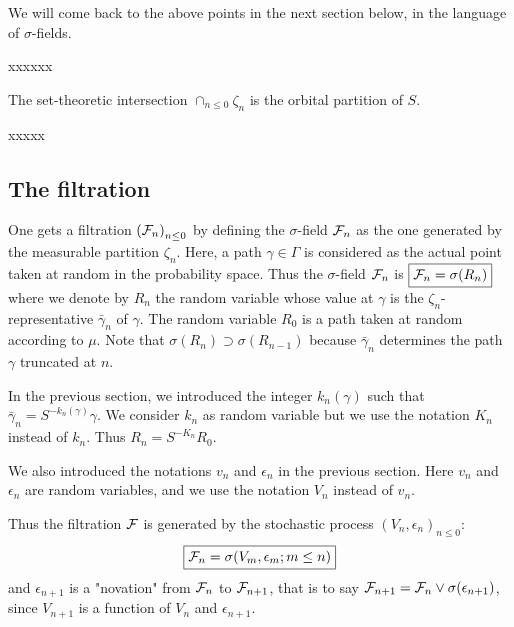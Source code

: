 \documentclass[12pt,a4paper]{article}
\begin{document}
We will come back to the above points in the next section below, in the 
language of $\sigma$-fields. 

\bigskip 

xxxxxx

\begin{lemma}
The set-theoretic intersection $\cap_{n \leq 0} \zeta_n$ is the orbital partition of $S$. 
\end{lemma}


%

xxxxx

\subsection{The filtration}

One gets a filtration ${(\mathcal{F}_n)}_{n \leq 0}$ by defining the $\sigma$-field 
$\mathcal{F}_n$ as the one generated by the measurable partition $\zeta_n$. 
Here, a path $\gamma \in \Gamma$ is considered as the actual point taken at random 
in the probability space. 
Thus the $\sigma$-field $\mathcal{F}_n$ is 
$\boxed{\mathcal{F}_n = \sigma(R_n)}$ where we denote by $R_n$ the random variable whose 
value at $\gamma$ is the $\zeta_n$-representative 
$\bar\gamma_n$ of $\gamma$. 
The random variable  $R_0$ is a path taken at random according to $\mu$. 
Note that $\sigma(R_{n}) \supset \sigma(R_{n-1})$ because 
$\bar\gamma_n$ determines the path 
$\gamma$ truncated at $n$. 

In the previous section, we introduced the integer $k_n(\gamma)$ such that 
$\bar\gamma_n = S^{-k_n(\gamma)}\gamma$. 
We consider $k_n$ as random variable but 
we use the notation $K_n$ instead of $k_n$. 
Thus $\boxed{R_n = S^{-K_n} R_0}$. 


We also introduced the notations $v_n$ and $\epsilon_n$ in the previous section. 
Here $v_n$ and $\epsilon_n$ are random variables, 
and we use the notation $V_n$ instead of $v_n$. 

Thus the filtration $\mathcal{F}$ is  generated by the stochastic process 
${(V_n, \epsilon_n)}_{n \leq 0}$:
$$
\boxed{\mathcal{F}_n = \sigma(V_m, \epsilon_m; m \leq n)}
$$
 and $\epsilon_{n+1}$ is a "novation" from $\mathcal{F}_n$ to $\mathcal{F}_{n+1}$, that is 
to say $\mathcal{F}_{n+1} = \mathcal{F}_n \vee \sigma(\epsilon_{n+1})$, since 
$V_{n+1}$ is a function of $V_n$ and $\epsilon_{n+1}$. 
\end{document}
